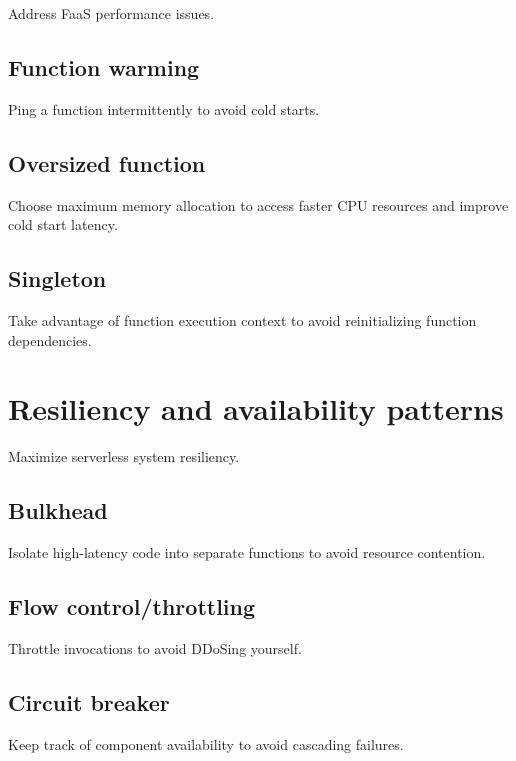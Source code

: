 Address FaaS performance issues.

\subsection{Function warming} \label{subsubsec:FunctionWarming}

Ping a function intermittently to avoid cold starts.

\subsection{Oversized function} \label{subsubsec:OversizedFunction}

Choose maximum memory allocation to access faster CPU resources and improve cold start latency.

\subsection{Singleton} \label{subsubsec:Singleton}

Take advantage of function execution context to avoid reinitializing function dependencies.

\section{Resiliency and availability patterns} \label{sec:resiliencyPatterns}

Maximize serverless system resiliency.

\subsection{Bulkhead} \label{subsubsec:Bulkhead}

Isolate high-latency code into separate functions to avoid resource contention.

\subsection{Flow control/throttling} \label{subsubsec:Flow control/throttling}

Throttle invocations to avoid DDoSing yourself.

\subsection{Circuit breaker} \label{subsubsec:Circuit breaker}

Keep track of component availability to avoid cascading failures.

